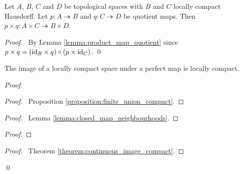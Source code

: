 \begin{theorem}
    Let $A$, $B$, $C$ and $D$ be topological spaces with $B$ and $C$ locally
    compact Hausdorff. Let $p : A \twoheadrightarrow B$ and $q : C
    \twoheadrightarrow D$ be quotient maps. Then $p \times q : A \times C
    \twoheadrightarrow B \times D$.
\end{theorem}

\begin{proof}
    \pf\ By Lemma \ref{lemma:product_map_quotient} since $p \times q =
    (\mathrm{id}_{B} \times q) \circ (p \times \mathrm{id}_{C})$. \qed
\end{proof}

\begin{proposition}
    \label{proposition:perfect_image_locally_compact}
    The image of a locally compact space under a perfect map is locally compact.
\end{proposition}

\begin{proof}
    \pf
    \begin{proof}
        \pf\ Proposition \ref{proposition:finite_union_compact}.
    \end{proof}
    \begin{proof}
        \pf\ Lemma \ref{lemma:closed_map_neighbourhoods}.
    \end{proof}
    \begin{proof}
    \end{proof}
    \begin{proof}
        \pf\ Theorem \ref{theorem:continuous_image_compact}.
    \end{proof}
    \qed
\end{proof}


